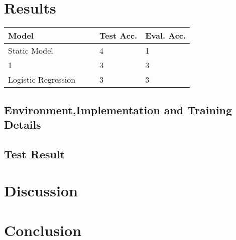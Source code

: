 \documentclass[10pt,conference,compsocconf]{IEEEtran}
\begin{document}
\section{Results}
\begin{table}[]
	\begin{tabular}{lllll}
		\hline
		Model&  &  & Test Acc. &Eval. Acc.  \\ \hline
		Static Model&  &  & 4 &1  \\ \hline
		1&  &  &3  & 3 \\
		Logistic Regression&  &  &  3&3  \\ \hline
	\end{tabular}
\end{table}
\subsection{Environment,Implementation and Training Details}
\subsection{Test Result}

\section{Discussion}

\section{Conclusion}








%
%
\end{document}
